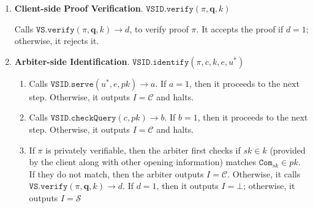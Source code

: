\begin{enumerate}
\item\textbf{Client-side Proof Verification}. $\mathtt{VSID.verify}(\pi,\bm{q},k)$

Calls $\mathtt{VS.verify}(\pi,\bm{q},k)\rightarrow d$, to verify  proof $\pi$. It accepts the proof if $d=1$; otherwise, it rejects it. 




\item\textbf{Arbiter-side Identification}. $\mathtt{VSID.identify}(\pi,c,k,e,u^{\scriptscriptstyle *})$ 
\begin{enumerate}


\item\label{Arb-VSID.serve} Calls $\mathtt{VSID.serve}(u^{\scriptscriptstyle *},e,pk)\rightarrow a$. If $a=1$, then it proceeds to the next step. Otherwise, it outputs $I=\mathcal C$ and halts. 

\item Calls $\mathtt{VSID.checkQuery}(c, pk)\rightarrow b$. If $b=1$, then it proceeds to the next step. Otherwise, it outputs $I=\mathcal C$ and halts. 

\item  If $\pi$ is  privately verifiable, then the arbiter  first checks if $sk\in k$ (provided by the client along with other opening information) matches $\mathtt{Com}_{\scriptscriptstyle sk}\in pk$. If they do not match, then the arbiter outputs $I=\mathcal C$. Otherwise,  it calls $\mathtt{VS.verify}(\pi, \bm{q},k)\rightarrow d$. If $d=1$, then it outputs $I=\bot$; otherwise, it outputs $I=\mathcal S$
\end{enumerate}
\end{enumerate}

